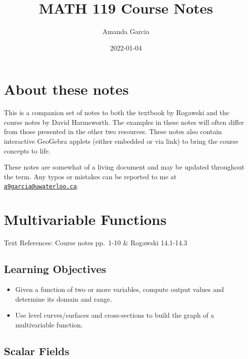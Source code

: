 \documentclass[
]{book}
\title{MATH 119 Course Notes}
\author{Amanda Garcia}
\date{2022-01-04}
\providecommand{\tightlist}{%
  \setlength{\itemsep}{0pt}\setlength{\parskip}{0pt}}
\theoremstyle{definition}
\theoremstyle{definition}
\theoremstyle{definition}
\theoremstyle{definition}
\theoremstyle{remark}
\begin{document}
\maketitle

{
\setcounter{tocdepth}{1}
\tableofcontents
}
\hypertarget{about-these-notes}{%
\chapter*{About these notes}\label{about-these-notes}}

This is a companion set of notes to both the textbook by Rogawski and the course notes by David Harmsworth. The examples in these notes will often differ from those presented in the other two resources. These notes also contain interactive GeoGebra applets (either embedded or via link) to bring the course concepts to life.

These notes are somewhat of a living document and may be updated throughout the term. Any typos or mistakes can be reported to me at \href{mailto:a9garcia@uwaterloo.ca}{\nolinkurl{a9garcia@uwaterloo.ca}}.

\hypertarget{lec-1}{%
\chapter{Multivariable Functions}\label{lec-1}}

Text References: Course notes pp.~1-10 \& Rogawski 14.1-14.3

\hypertarget{learning-objectives}{%
\section{Learning Objectives}\label{learning-objectives}}

\begin{itemize}
\tightlist
\item
  Given a function of two or more variables, compute output values and determine its domain and range.
\item
  Use level curves/surfaces and cross-sections to build the graph of a multivariable function.
\end{itemize}

\hypertarget{scalar-fields}{%
\section{Scalar Fields}\label{scalar-fields}}
\end{document}
